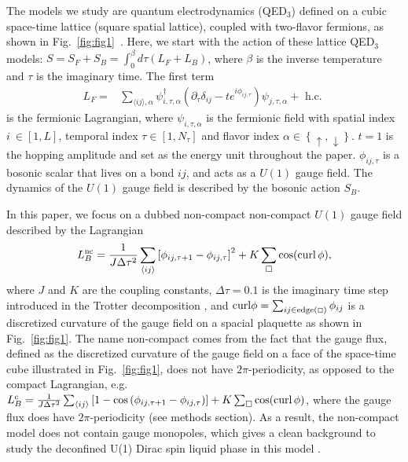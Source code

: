 \documentclass[aps,prl,twocolumn,superscriptaddress,showpacs,longbibliography]{revtex4-2}
\newcommand{\tx}[1]{\textmd{#1}}
\newcommand{\reffg}[1]{\textmd{Fig.\ }\ref{#1}}
\newcommand{\leftc}{\left\{ }
\newcommand{\rightc}{\right\} }
\newcommand{\leftr}{\left[}
\newcommand{\rightr}{\right]}
\begin{document}

The models we study are quantum electrodynamics (QED$_3$) defined on a cubic space-time lattice (square spatial lattice), coupled with two-flavor fermions, as shown in Fig.~\ref{fig:fig1}~\cite{XYXuU12018,wangDynamics2019}.  
Here, we start with the action of these lattice QED$_3$ models: $S=S_F+S_B = \int_0^\beta d \tau\left(L_F+L_B\right)$, where $\beta$ is the inverse temperature and $\tau$ is the imaginary time. The first term
\begin{align}
L_F= & \sum_{\langle i j \rangle, \alpha} \psi_{i,\tau, \alpha}^{\dagger}\left( \partial_\tau \delta_{i j} - t e^{i \phi_{i j, \tau}}\right) \psi_{j,\tau, \alpha}+\text { h.c. }
\label{eq:eq1}
\end{align}
is the fermionic Lagrangian, where $\psi_{i,\tau, \alpha}$ is the fermionic field with spatial index $i\ \in [1, L]$, temporal index $\tau \in [1, N_\tau]$ and flavor index $\alpha \in \leftc \uparrow, \downarrow\rightc$. $t=1$ is the hopping amplitude and set as the energy unit throughout the paper. $\phi_{ij, \tau}$ is a bosonic scalar that lives on a bond $ij$, and acts as a $U(1)$ gauge field. The dynamics of the $U(1)$ gauge field is described by the bosonic action $S_B$. 

In this paper, we focus on a dubbed non-compact non-compact $U(1)$ gauge field described by the Lagrangian
\begin{align}
L_B^\tx{nc} = \frac{1}{J  \Delta \tau^2} \sum_{\langle i j\rangle}
\left[\phi_{i j, \tau + 1}-\phi_{i j, \tau}\right]^2 + K \sum_{\square} \cos (\operatorname{curl} \phi),
\label{eq:eq3}
\end{align}
where $J$ and $K$ are the coupling constants, $\Delta\tau = 0.1$ is the imaginary time step introduced in the Trotter decomposition \cite{XYXuU12018}, and $\tx{curl}\phi = \sum_{ij\in\tx{edge}(\Box)}\phi_{ij}$ is a discretized curvature of the gauge field  on a spacial plaquette as shown in \reffg{fig:fig1}. The name non-compact comes from the fact that the gauge flux, defined as the discretized curvature of the gauge field \cite{Fiebig1990, degrand1980topological} on a face of the space-time cube illustrated in \reffg{fig:fig1}, does not have $2\pi$-periodicity, as opposed to the compact Lagrangian, e.g.\ $L_B^\tx{c}= \frac{1}{J \Delta \tau^2} \sum_{\langle i j\rangle}
\leftr 1-\cos \left( \phi_{i j, \tau+1}-\phi_{i j, \tau}\right)\rightr + K \sum_{\square} \cos (\operatorname{curl} \phi)$, where the gauge flux does have $2\pi$-periodicity (see methods section). As a result, the non-compact model does not contain gauge monopoles, which gives a clean background to study the deconfined U(1) Dirac spin liquid phase in this model \cite{XYXuU12018}.
\end{document}

